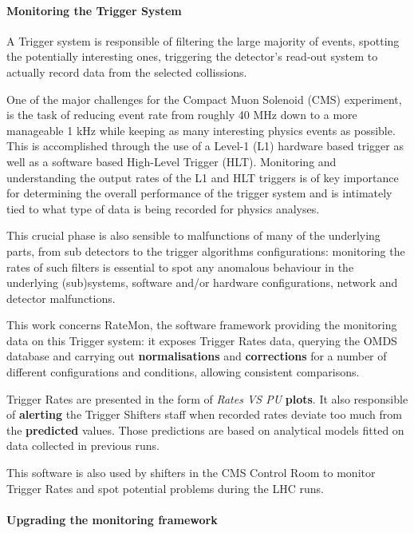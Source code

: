 \documentclass[a4, oneside, 10pt, nobib]{memoir}
\begin{document}
		\paragraph{Monitoring the Trigger System}

		A Trigger system is responsible of filtering the large majority of events, spotting the potentially interesting ones, triggering the detector's read-out system to actually record data from the selected collissions.

		One of the major challenges for the Compact Muon Solenoid (CMS) experiment, is the task of reducing event rate from roughly 40 MHz down to a more manageable 1 kHz while keeping as many interesting physics events as possible. This is accomplished through the use of a Level-1 (L1) hardware based trigger as well as a software based High-Level Trigger (HLT). Monitoring and understanding the output rates of the L1 and HLT triggers is of key importance for determining the overall performance of the trigger system and is intimately tied to what type of data is being recorded for physics analyses.

		This crucial phase is also sensible to malfunctions of many of the underlying parts, from sub detectors to the trigger algorithms configurations: monitoring the rates of such filters is essential to spot any anomalous behaviour in the underlying (sub)systems, software and/or hardware configurations, network and detector malfunctions.

		This work concerns RateMon, the software framework providing the monitoring data on this Trigger system: it exposes Trigger Rates data, querying the OMDS database and carrying out \textbf{normalisations} and \textbf{corrections} for a number of different configurations and conditions, allowing consistent comparisons.

		Trigger Rates are presented in the form of \textit{Rates VS PU} \textbf{plots}. It also responsible of \textbf{alerting} the Trigger Shifters staff when recorded rates deviate too much from the \textbf{predicted} values. Those predictions are based on analytical models fitted on data collected in previous runs.

		This software is also used by shifters in the CMS Control Room to monitor Trigger Rates and spot 
		potential problems during the LHC runs.
		
		\paragraph{Upgrading the monitoring framework} 
\end{document}

